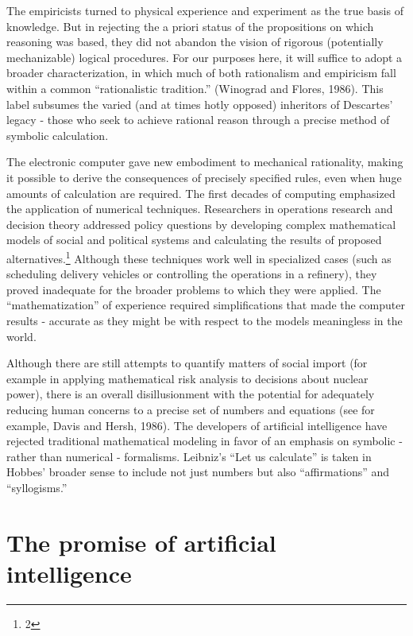 \documentclass[12pt]{article}
\begin{document}
The empiricists turned to physical experience and experiment as the true basis of knowledge. But in rejecting the a priori status of the propositions on which reasoning was based, they did not abandon the vision of rigorous (potentially mechanizable) logical procedures. For our purposes here, it will suffice to adopt a broader characterization, in which much of both rationalism and empiricism fall within a common ``rationalistic tradition.'' (Winograd and Flores, 1986). This label subsumes the varied (and at times hotly opposed) inheritors of Descartes’ legacy - those who seek to achieve rational reason through a precise method of symbolic calculation.

The electronic computer gave new embodiment to mechanical rationality, making it possible to derive the consequences of precisely specified rules, even when huge amounts of calculation are required. The first decades of computing emphasized the application of numerical techniques. Researchers in operations research and decision theory addressed policy questions by developing complex mathematical models of social and political systems and calculating the results of proposed alternatives.\footnote{2}
Although these techniques work well in specialized cases (such as scheduling delivery vehicles or controlling the operations in a refinery), they proved inadequate for the broader problems to which they were applied. The ``mathematization'' of experience required simplifications that made the computer results - accurate as they might be with respect to the models meaningless in the world.

Although there are still attempts to quantify matters of social import (for example in applying mathematical risk analysis to decisions about nuclear power), there is an overall disillusionment with the potential for adequately reducing human concerns to a precise set of numbers and equations (see for example, Davis and Hersh, 1986). The developers of artificial intelligence have rejected traditional mathematical modeling in favor of an emphasis on symbolic - rather than numerical - formalisms. Leibniz’s “Let us calculate” is taken in Hobbes’ broader sense to include not just numbers but also “affirmations” and “syllogisms.”

\section{The promise of artificial intelligence}
\end{document}
